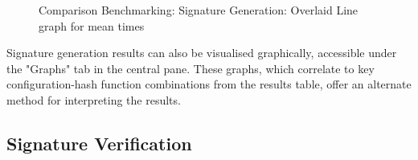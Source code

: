 \documentclass[]{final_report}
\theoremstyle{definition}
\begin{document}
\begin{figure}[H]
\begin{minipage}{0.7\textwidth}
        \centering
        \caption{Comparison Benchmarking: Signature Generation: Overlaid Line graph for mean times}
        \label{fig:image2}
    \end{minipage}
\end{figure}

Signature generation results can also be visualised graphically, accessible under the "Graphs" tab in the central pane. These graphs, which correlate to key configuration-hash function combinations from the results table, offer an alternate method for interpreting the results.

\subsection{Signature Verification}
\end{document}
